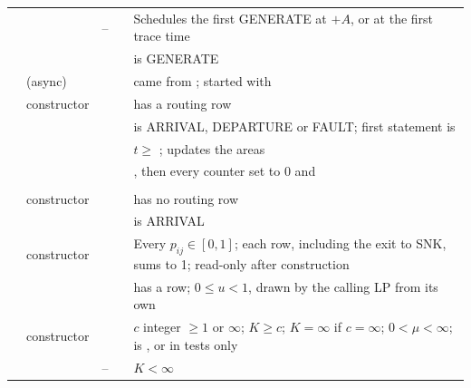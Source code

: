 \documentclass[11pt,a4paper]{article}
\begin{document}
{\begin{xltabular}{\textwidth}{@{}P{2.4cm}P{2.6cm}P{3.9cm}P{2.4cm}L@{}}
 &  & -- &  & Schedules the first GENERATE at  $+ A$, or at the first trace time\\
 &  &  &  &  is GENERATE\\
 &  (async) &  &  &  came from ; started with \\
 & constructor &  &  &  has a routing row\\
 &  &  &  &  is ARRIVAL, DEPARTURE or FAULT; first statement is \\
 &  &  &  & $t \ge$ ; updates the areas\\
 &  &  &  & , then every counter set to 0 and \\
 &  &  &  & \\
 & constructor &  &  &  has no routing row\\
 &  &  &  &  is ARRIVAL\\
 & constructor &  &  & Every $p_{ij} \in [0,1]$; each row, including the exit to SNK, sums to 1; read-only after construction\\
 &  &  &  &  has a row; $0 \le u < 1$, drawn by the calling LP from its own \\
 & constructor &  &  & $c$ integer $\ge 1$ or $\infty$; $K \ge c$; $K = \infty$ if $c = \infty$; $0 < \mu < \infty$;  is , or  in tests only\\
 &  & -- &  & $K < \infty$\\
\bottomrule
\end{xltabular}
}

\end{document}
